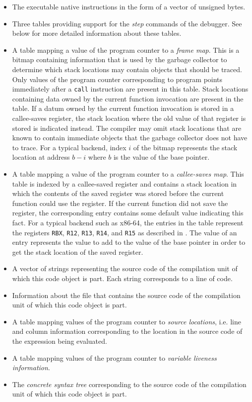 \begin{itemize}
\item The executable native instructions in the form of a vector of
  unsigned bytes.
\item Three tables providing support for the \emph{step} commands of
  the debugger.  See below for more detailed information about these
  tables.
\item A table mapping a value of the program counter to a \emph{frame
  map}.  This is a bitmap containing information that is used by the
  garbage collector to determine which stack locations may contain
  \commonlisp{} objects that should be traced.  Only values of the
  program counter corresponding to program points immediately after a
  \texttt{call} instruction are present in this table.  Stack
  locations containing data owned by the current function invocation
  are present in the table.  If a datum owned by the current function
  invocation is stored in a callee-saves register, the stack location
  where the old value of that register is stored is indicated instead.
  The compiler may omit stack locations that are known to contain
  immediate \commonlisp{} objects that the garbage collector does not
  have to trace.  For a typical backend, index $i$ of the bitmap
  represents the stack location at address $b-i$ where $b$ is the
  value of the base pointer.
\item A table mapping a value of the program counter to a
  \emph{callee-saves map}.  This table is indexed by a callee-saved
  register and contains a stack location in which the contents of the
  saved register was stored before the current function could use the
  register.  If the current function did not save the register, the
  corresponding entry contains some default value indicating this
  fact.  For a typical backend such as x86-64, the entries in the
  table represent the registers \texttt{RBX}, \texttt{R12},
  \texttt{R13}, \texttt{R14}, and \texttt{R15} as described in
  .  The value of an entry
  represents the value to add to the value of the base pointer in order
  to get the stack location of the saved register.
\item A vector of strings representing the source code of the
  compilation unit of which this code object is part.  Each string
  corresponds to a line of code.
\item Information about the file that contains the source code of the
  compilation unit of which this code object is part.
\item A table mapping values of the program counter to \emph{source
  locations}, i.e. line and column information corresponding to the
  location in the source code of the expression being evaluated.
\item A table mapping values of the program counter to \emph{variable
  liveness information}.
\item The \emph{concrete syntax tree} corresponding to the source code
  of the compilation unit of which this code object is part.
\end{itemize}

